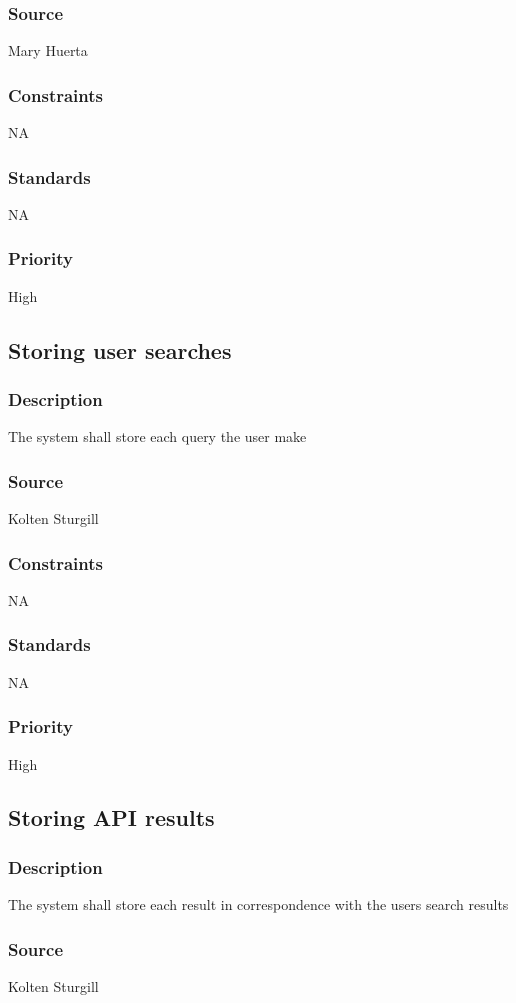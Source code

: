 \subsubsection{Source}
Mary Huerta
\subsubsection{Constraints}
NA
\subsubsection{Standards}
NA
\subsubsection{Priority}
High



\subsection{Storing user searches}
\subsubsection{Description}
The system shall store each query the user make
\subsubsection{Source}
Kolten Sturgill
\subsubsection{Constraints}
NA
\subsubsection{Standards}
NA
\subsubsection{Priority}
High


\subsection{Storing API results}
\subsubsection{Description}
The system shall store each result in correspondence with the users search results
\subsubsection{Source}
Kolten Sturgill
